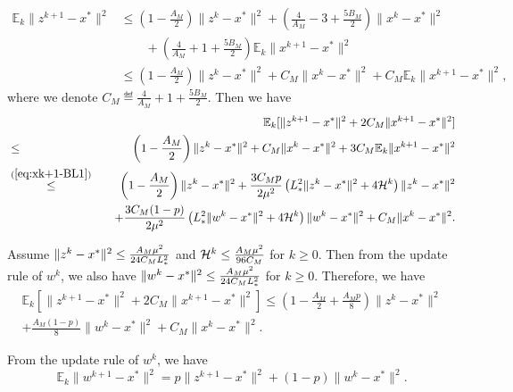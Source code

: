 \documentclass[11pt]{article}
\begin{document}
	\begin{align}
		\mathbb{E}_k\|z^{k+1}-x^*\|^2
		& \leq \left(  1 - \frac{A_M}{2}  \right) \|z^k-x^*\|^2 + \left(  \frac{4}{A_M} - 3 + \frac{5B_M}{2}  \right) \|x^k-x^*\|^2 \nonumber  \\ 
		& \qquad + \left(  \frac{4}{A_M} + 1 + \frac{5B_M}{2}  \right) \mathbb{E}_k\|x^{k+1}-x^*\|^2 \nonumber \\
		& \leq \left(  1 - \frac{A_M}{2}  \right) \|z^k-x^*\|^2 + C_M \|x^k-x^*\|^2  + C_M \mathbb{E}_k\|x^{k+1}-x^*\|^2, \label{eq:zk+1nbor-3PCBL1}
	\end{align}
	where we denote $C_M \eqdef  \frac{4}{A_M} + 1 + \frac{5B_M}{2}$. Then we have 
	\begin{eqnarray*}
		&& \mathbb{E}_k [\|z^{k+1}-x^*\|^2 + 2C_M \|x^{k+1}-x^*\|^2 ] \\
		&\leq& \left(  1 - \frac{A_M}{2}  \right) \|z^k-x^*\|^2 + C_M \|x^k-x^*\|^2  +  3C_M \mathbb{E}_k\|x^{k+1}-x^*\|^2 \\ 
		&\overset{(\ref{eq:xk+1-BL1})}{\leq}&  \left(  1 - \frac{A_M}{2}  \right) \|z^k-x^*\|^2  + \frac{3C_Mp}{2\mu^2} \left(  L_{*}^2 \|z^k-x^*\|^2 + 4 {\cal H}^k  \right) \|z^k-x^*\|^2 \\ 
		&& \quad + \frac{3C_M(1-p)}{2\mu^2} \left(  L_{*}^2 \|w^k-x^*\|^2 + 4 {\cal H}^k  \right) \|w^k-x^*\|^2 + C_M \|x^k-x^*\|^2. 
	\end{eqnarray*}
	
	Assume $\|z^k-x^*\|^2 \leq \frac{A_M \mu^2}{24C_M L_{*}^2}$ and ${\cal H}^k \leq \frac{A_M \mu^2}{96C_M}$ for $k\geq 0$. Then from the update rule of $w^k$, we also have  $\|w^k-x^*\|^2 \leq \frac{A_M \mu^2}{24C_M L_{*}^2}$ for $k\geq 0$. Therefore, we have 
	\begin{multline}\label{eq:zk+1-3PCBL1}
		\mathbb{E}_k [\|z^{k+1}-x^*\|^2 + 2C_M \|x^{k+1}-x^*\|^2 ] \leq \left(  1 - \frac{A_M}{2} + \frac{A_M p}{8}  \right) \|z^k-x^*\|^2 \\ + \frac{A_M (1-p)}{8} \|w^k-x^*\|^2 + C_M \|x^k-x^*\|^2. 
	\end{multline}
	
	From the update rule of $w^k$, we have 
	\begin{equation}\label{eq:wk+1-3PCBL1}
		\mathbb{E}_k\|w^{k+1} - x^*\|^2 = p\|z^{k+1}-x^*\|^2 + (1-p) \|w^k-x^*\|^2. 
	\end{equation}
	
\end{document}
